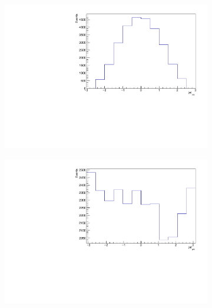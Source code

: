 \begin{figure}[H]
  \begin{subfigure}{0.5\textwidth}
    \centering
    \includegraphics[width=\linewidth]{plots_and_txt/ttbar.mu_selected_/ttbar.mu_selected_jet_eta.pdf}
    \caption{}
    \label{fig:lep_pt4}
  \end{subfigure}%
  \begin{subfigure}{0.5\textwidth}
    \centering
    \includegraphics[width=\linewidth]{plots_and_txt/ttbar.mu_selected_/ttbar.mu_selected_jet_phi.pdf}
    \caption{}
    \label{fig:btagged4}
  \end{subfigure}%
  \newline
  \begin{subfigure}{0.5\textwidth}
    \centering

\end{subfigure}
\end{figure}
